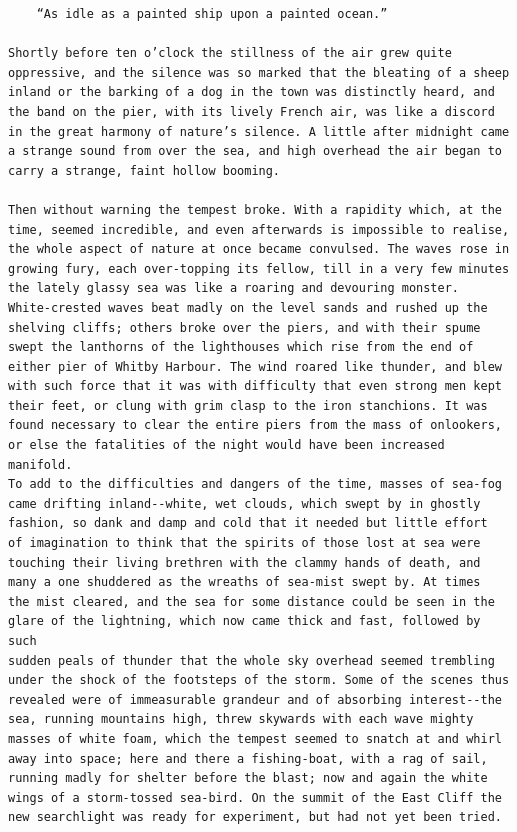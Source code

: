 \documentclass{article}
\begin{document}
\begin{verbatim}
    “As idle as a painted ship upon a painted ocean.”

Shortly before ten o’clock the stillness of the air grew quite
oppressive, and the silence was so marked that the bleating of a sheep
inland or the barking of a dog in the town was distinctly heard, and
the band on the pier, with its lively French air, was like a discord
in the great harmony of nature’s silence. A little after midnight came
a strange sound from over the sea, and high overhead the air began to
carry a strange, faint hollow booming.

Then without warning the tempest broke. With a rapidity which, at the
time, seemed incredible, and even afterwards is impossible to realise,
the whole aspect of nature at once became convulsed. The waves rose in
growing fury, each over-topping its fellow, till in a very few minutes
the lately glassy sea was like a roaring and devouring monster.
White-crested waves beat madly on the level sands and rushed up the
shelving cliffs; others broke over the piers, and with their spume
swept the lanthorns of the lighthouses which rise from the end of
either pier of Whitby Harbour. The wind roared like thunder, and blew
with such force that it was with difficulty that even strong men kept
their feet, or clung with grim clasp to the iron stanchions. It was
found necessary to clear the entire piers from the mass of onlookers,
or else the fatalities of the night would have been increased manifold.
To add to the difficulties and dangers of the time, masses of sea-fog
came drifting inland--white, wet clouds, which swept by in ghostly
fashion, so dank and damp and cold that it needed but little effort
of imagination to think that the spirits of those lost at sea were
touching their living brethren with the clammy hands of death, and
many a one shuddered as the wreaths of sea-mist swept by. At times
the mist cleared, and the sea for some distance could be seen in the
glare of the lightning, which now came thick and fast, followed by such
sudden peals of thunder that the whole sky overhead seemed trembling
under the shock of the footsteps of the storm. Some of the scenes thus
revealed were of immeasurable grandeur and of absorbing interest--the
sea, running mountains high, threw skywards with each wave mighty
masses of white foam, which the tempest seemed to snatch at and whirl
away into space; here and there a fishing-boat, with a rag of sail,
running madly for shelter before the blast; now and again the white
wings of a storm-tossed sea-bird. On the summit of the East Cliff the
new searchlight was ready for experiment, but had not yet been tried.

\end{verbatim}
\end{document}
